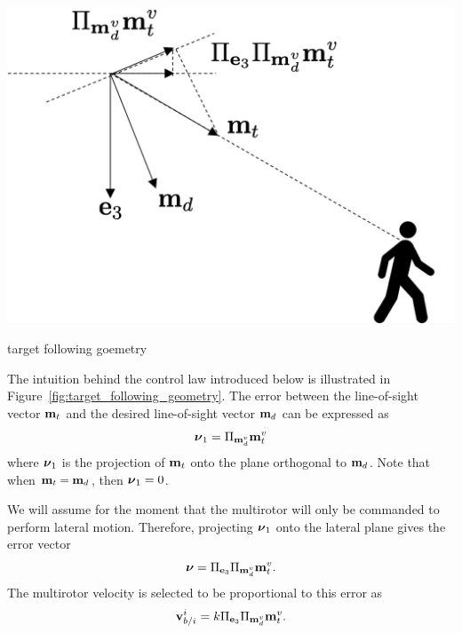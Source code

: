 \begin{marginfigure}
	\includegraphics[width=\linewidth]{chap10_tracking/figures/target_following_geometry}
	\caption{target following goemetry}
	\label{fig:target_following_geometry}
\end{marginfigure}
The intuition behind the control law introduced below is illustrated in Figure~\ref{fig:target_following_geometry}.
The error between the line-of-sight vector $\mathbf{m}_t$ and the desired line-of-sight vector $\mathbf{m}_d$ can be expressed as
\[
\boldsymbol{\nu}_1 = \Pi_{\mathbf{m}_d^v} \mathbf{m}_t^v
\]
where $\boldsymbol{\nu}_1$ is the projection of $\mathbf{m}_t$ onto the plane orthogonal to $\mathbf{m}_d$.  Note that when $\mathbf{m}_t=\mathbf{m}_d$, then $\boldsymbol{\nu}_1=0$.  

We will assume for the moment that the multirotor will only be commanded to perform lateral motion.  Therefore, projecting $\boldsymbol{\nu}_1$ onto the lateral plane gives the error vector
\[
\boldsymbol{\nu} = \Pi_{\mathbf{e}_3}\Pi_{\mathbf{m}_d^v}\mathbf{m}_t^v. 
\]
The multirotor velocity is selected to be proportional to this error as 
\begin{equation} \label{eq:multirotor_tracking_velocity}
\vbf_{b/i}^i = k \Pi_{\ebf_3} \Pi_{\mbf_d^v} \mbf_t^v.
\end{equation}


